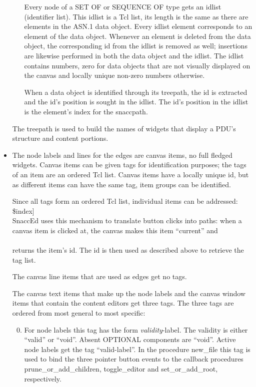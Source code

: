 \begin{itemize}
\begin{itemize}
	Every node of a SET OF or SEQUENCE OF type gets an idlist (identifier list).
	This idlist is a Tcl list, its length is the same as there are elements in the ASN.1 data object.
	Every idlist element corresponds to an element of the data object.
	Whenever an element is deleted from the data object, the corresponding id from the idlist is removed as well; insertions are likewise performed in both the data object and the idlist.
	The idlist contains numbers, zero for data objects that are not visually displayed on the canvas and locally unique non-zero numbers otherwise.

	When a data object is identified through its treepath, the id is extracted and the id's position is sought in the idlist.
	The id's position in the idlist is the element's index for the snaccpath.
    \end{itemize}

    The treepath is used to build the names of widgets that display a PDU's structure and content portions.
  \item
    The node labels and lines for the edges are canvas items, no full fledged widgets.
    Canvas items can be given tags for identification purposes; the tags of an item are an ordered Tcl list.
    Canvas items have a locally unique id, but as different items can have the same tag, item groups can be identified.

    Since all tags form an ordered Tcl list, individual items can be addressed:\\
    {\Tcl [lindex [\$canvas gettags \$id] \$index]}\\
    SnaccEd uses this mechanism to translate button clicks into paths: when a canvas item is clicked at, the canvas makes this item ``current'' and\\
    {}\\
    returns the item's id.
    The id is then used as described above to retrieve the tag list.

    The canvas line items that are used as edges get no tags.

    The canvas text items that make up the node labels and the canvas window items that contain the content editors get three tags.
    The three tags are ordered from most general to most specific:
    \begin{enumerate}\setcounter{enumi}{-1}%
      \item
	For node labels this tag has the form \emph{validity}-label.
	The validity is either ``valid'' or ``void''.
	Absent OPTIONAL components are ``void''.
	Active node labels get the tag ``valid-label''.
	In the procedure {\Tcl new\_file} this tag is used to bind the three pointer button events to the callback procedures {\Tcl prune\_or\_add\_children}, {\Tcl toggle\_editor} and {\Tcl set\_or\_add\_root}, respectively.


\end{enumerate}
\end{itemize}
